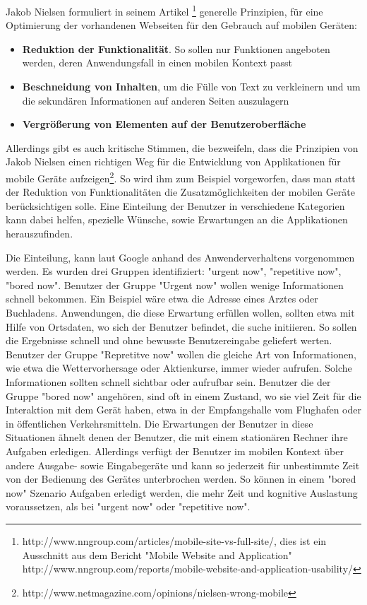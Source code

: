 Jakob Nielsen formuliert in seinem Artikel \footnote{http://www.nngroup.com/articles/mobile-site-vs-full-site/, dies ist ein  Ausschnitt aus dem Bericht "Mobile Website and Application" http://www.nngroup.com/reports/mobile-website-and-application-usability/} generelle Prinzipien, für eine Optimierung der vorhandenen Webseiten für den Gebrauch auf mobilen Geräten:
\begin{itemize}
	\item \textbf{Reduktion der Funktionalität}. So sollen nur Funktionen angeboten werden, deren Anwendungsfall in einen mobilen Kontext passt
	\item \textbf{Beschneidung von Inhalten}, um die Fülle von Text zu verkleinern und um die sekundären Informationen auf anderen Seiten auszulagern
	\item \textbf{Vergrößerung von Elementen auf der Benutzeroberfläche}
\end{itemize}

Allerdings gibt es auch kritische Stimmen, die bezweifeln, dass die Prinzipien von Jakob Nielsen einen richtigen Weg für die Entwicklung von Applikationen für mobile Geräte aufzeigen\footnote{http://www.netmagazine.com/opinions/nielsen-wrong-mobile}. So wird ihm zum Beispiel vorgeworfen, dass man statt der Reduktion von Funktionalitäten die Zusatzmöglichkeiten der mobilen Geräte berücksichtigen solle. Eine Einteilung der Benutzer in verschiedene Kategorien kann dabei helfen, spezielle Wünsche, sowie Erwartungen an die Applikationen herauszufinden.

Die Einteilung, kann laut Google anhand des Anwenderverhaltens vorgenommen werden. Es wurden drei Gruppen identifiziert: "urgent now", "repetitive now", "bored now"\cite{googleUsers}. Benutzer der Gruppe "Urgent now" wollen wenige Informationen schnell bekommen. Ein Beispiel wäre etwa die Adresse eines  Arztes oder Buchladens. Anwendungen, die diese Erwartung erfüllen wollen, sollten etwa mit Hilfe von Ortsdaten, wo sich der Benutzer befindet, die suche initiieren. So sollen die Ergebnisse schnell und ohne bewusste Benutzereingabe geliefert werten. Benutzer der Gruppe "Repretitve now" wollen die gleiche Art von Informationen, wie etwa die Wettervorhersage oder Aktienkurse, immer wieder aufrufen. Solche Informationen sollten schnell sichtbar oder aufrufbar sein. Benutzer die der Gruppe "bored now" angehören, sind oft in einem Zustand, wo sie viel Zeit für die Interaktion mit dem Gerät haben, etwa in der Empfangshalle vom Flughafen oder in öffentlichen Verkehrsmitteln. Die Erwartungen der Benutzer in diese Situationen ähnelt denen der Benutzer, die mit einem stationären Rechner ihre Aufgaben erledigen. Allerdings verfügt der Benutzer im mobilen Kontext über andere Ausgabe- sowie Eingabegeräte und kann so jederzeit für unbestimmte Zeit von der Bedienung des Gerätes unterbrochen werden. So können in einem "bored now" Szenario Aufgaben erledigt werden, die mehr Zeit und kognitive Auslastung voraussetzen, als bei "urgent now" oder "repetitive now".

